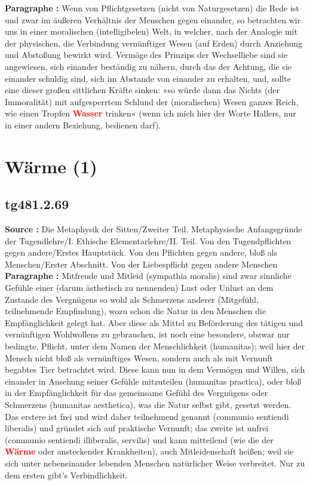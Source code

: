\documentclass[a4paper,12pt,twoside]{book}
\newcommand{\match}[1]{\textcolor{red}{\textbf{#1}}}
\newcommand{\unnumberedsection}[1]{
	\section*{#1}
	\addcontentsline{toc}{section}{#1}
	\markright{#1}
}
\begin{document}
	\textbf{Paragraphe : }Wenn von Pflichtgesetzen (nicht von Naturgesetzen) die Rede ist und zwar im äußeren Verhältnis der Menschen gegen einander, so betrachten wir uns in einer moralischen (intelligibelen) Welt, in welcher, nach der Analogie mit der physischen, die Verbindung vernünftiger Wesen (auf Erden) durch Anziehung und Abstoßung bewirkt wird. Vermöge des Prinzips der Wechselliebe sind sie angewiesen, sich einander beständig zu nähern, durch das der Achtung, die sie einander schuldig sind, sich im Abstande von einander zu erhalten, und, sollte eine dieser großen sittlichen Kräfte sinken: »so würde dann das Nichts (der Immoralität) mit aufgesperrtem Schlund der (moralischen) Wesen ganzes Reich, wie einen Tropfen \match{Wasser} trinken« (wenn ich mich hier der Worte Hallers, nur in einer andern Beziehung, bedienen darf). 
	
	\unnumberedsection{Wärme (1)} 
	\subsection*{tg481.2.69} 
	\textbf{Source : }Die Metaphysik der Sitten/Zweiter Teil. Metaphysische Anfangsgründe der Tugendlehre/I. Ethische Elementarlehre/II. Teil. Von den Tugendpflichten gegen andere/Erstes Hauptstück. Von den Pflichten gegen andere, bloß als Menschen/Erster Abschnitt. Von der Liebespflicht gegen andere Menschen\\  
	
	\textbf{Paragraphe : }
	Mitfreude und Mitleid (sympathia moralis) sind zwar sinnliche Gefühle einer (darum ästhetisch zu nennenden) Lust oder Unlust an dem Zustande des Vergnügens so wohl als Schmerzens anderer (Mitgefühl, teilnehmende Empfindung), wozu schon die Natur in den Menschen die Empfänglichkeit gelegt hat. Aber diese als Mittel zu Beförderung des tätigen und vernünftigen Wohlwollens zu gebrauchen, ist noch eine besondere, obzwar nur bedingte, Pflicht, unter dem Namen der Menschlichkeit (humanitas); weil hier der Mensch nicht bloß als vernünftiges Wesen, sondern  auch als mit Vernunft begabtes Tier betrachtet wird. Diese kann nun in dem Vermögen und Willen, sich einander in Ansehung seiner Gefühle mitzuteilen (humanitas practica), oder bloß in der Empfänglichkeit für das gemeinsame Gefühl des Vergnügens oder Schmerzens (humanitas aesthetica), was die Natur selbst gibt, gesetzt werden. Das erstere ist frei und wird daher teilnehmend genannt (communio sentiendi liberalis) und gründet sich auf praktische Vernunft; das zweite ist unfrei (communio sentiendi illiberalis, servilis) und kann mitteilend (wie die der \match{Wärme} oder ansteckender Krankheiten), auch Mitleidenschaft heißen; weil sie sich unter nebeneinander lebenden Menschen natürlicher Weise verbreitet. Nur zu dem ersten gibt's Verbindlichkeit. 
	
\end{document}
